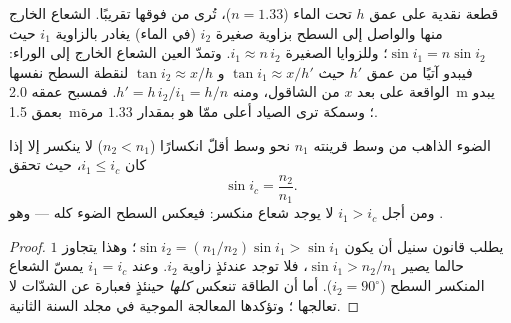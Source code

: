 \begin{example}\label{ex:b1:rays-reflection-refraction:depth}
قطعة نقدية على عمق $h$ تحت الماء ($n = 1.33$)، تُرى من فوقها تقريبًا.
الشعاع الخارج منها والواصل إلى السطح بزاوية صغيرة $i_2$ (في الماء)
يغادر بالزاوية $i_1$ حيث $\sin i_1 = n\sin i_2$؛ وللزوايا الصغيرة
$i_1 \approx n\,i_2$. وتمدّ العين الشعاع الخارج إلى الوراء: فيبدو
آتيًا من عمق $h'$ حيث $\tan i_1 \approx x/h'$ و
$\tan i_2 \approx x/h$ لنقطة السطح نفسها الواقعة على بعد $x$ من
الشاقول، ومنه $h' = h\,i_2/i_1 = h/n$. فمسبح عمقه \qty{2.0}{m} يبدو
بعمق \qty{1.5}{m}؛ وسمكة ترى الصياد أعلى ممّا هو بمقدار $1.33$ مرة.
\end{example}

\begin{theorem}\label{thm:b1:rays-reflection-refraction:tir}
الضوء الذاهب من وسط قرينته $n_1$ نحو وسط أقلّ انكسارًا
($n_2 < n_1$) لا ينكسر إلا إذا كان $i_1 \leq i_c$، حيث تحقق
\emph{}
\[
\sin i_c = \frac{n_2}{n_1} .
\]
ومن أجل $i_1 > i_c$ لا يوجد شعاع منكسر: فيعكس السطح الضوء كله ---
وهو \emph{}.
\end{theorem}

\begin{proof}
يطلب قانون سنيل أن يكون $\sin i_2 = (n_1/n_2)\sin i_1 > \sin i_1$؛
وهذا يتجاوز $1$ حالما يصير $\sin i_1 > n_2/n_1$، فلا توجد عندئذٍ زاوية
$i_2$. وعند $i_1 = i_c$ يمسّ الشعاع المنكسر السطح
($i_2 = 90^\circ$). أما أن الطاقة تنعكس \emph{كلها} حينئذٍ فعبارة عن
الشدّات لا تعالجها ؛ وتؤكدها المعالجة الموجية في
مجلد السنة الثانية.
\end{proof}

